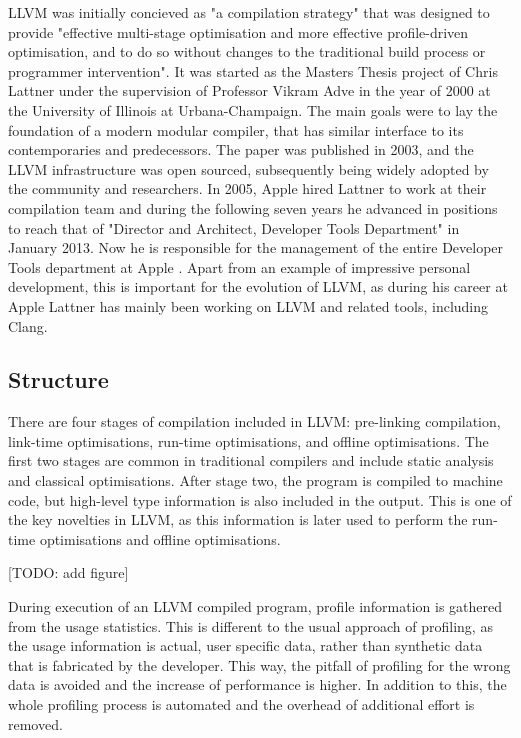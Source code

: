 \documentclass[parskip]{cs4rep}
\begin{document}
LLVM was initially concieved as "a compilation strategy" that was designed to provide "effective multi-stage optimisation and more effective profile-driven optimisation, and to do so without changes to the traditional build process or programmer intervention"\cite{Lattner2002}. It was started as the Masters Thesis project of Chris Lattner under the supervision of Professor Vikram Adve in the year of 2000 at the University of Illinois at Urbana-Champaign. The main goals were to lay the foundation of a modern modular compiler, that has similar interface to its contemporaries and predecessors. The paper was published in 2003, and the LLVM infrastructure was open sourced, subsequently being widely adopted by the community and researchers\cite{Lattner}. In 2005, Apple hired Lattner to work at their compilation team and during the following seven years he advanced in positions to reach that of "Director and Architect, Developer Tools Department" in January 2013. Now he is responsible for the management of the entire Developer Tools department at Apple \cite{LattnerResume}. Apart from an example of impressive personal development, this is important for the evolution of LLVM, as during his career at Apple Lattner has mainly been working on LLVM and related tools, including Clang.

\subsection{Structure}

There are four stages of compilation included in LLVM: pre-linking compilation, link-time optimisations, run-time optimisations, and offline optimisations\cite{Lattner2002}. The first two stages are common in traditional compilers and include static analysis and classical optimisations. After stage two, the program is compiled to machine code, but high-level type information is also included in the output. This is one of the key novelties in LLVM, as this information is later used to perform the run-time optimisations and offline optimisations.

[TODO: add figure]

During execution of an LLVM compiled program, profile information is gathered from the usage statistics. This is different to the usual approach of profiling, as the usage information is actual, user specific data, rather than synthetic data that is fabricated by the developer. This way, the pitfall of profiling for the wrong data is avoided and the increase of performance is higher. In addition to this, the whole profiling process is automated and the overhead of additional effort is removed. 
\end{document}
